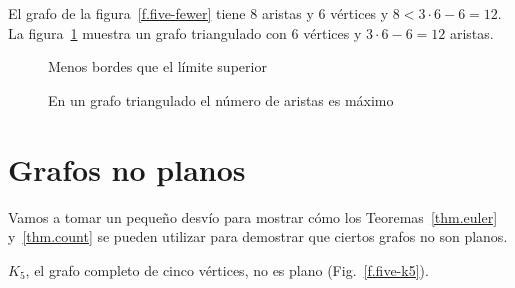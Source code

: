 \begin{example}
El grafo de la figura~\ref{f.five-fewer} tiene $8$ aristas y $6$ vértices y $8< 3\cdot 6 - 6= 12$.
La figura~\ref{f.five-upper-limit} muestra un grafo triangulado con $6$ vértices y $3\cdot 6 - 6= 12$ aristas.
\end{example}

\begin{figure}[t]
\begin{minipage}{.4\textwidth}
\begin{center}
\caption{Menos bordes que el límite superior}\label{f.five-fewer}
\end{center}
\end{minipage}
\hfill
\begin{minipage}{.55\textwidth}
\begin{center}
\caption{En un grafo triangulado el número de aristas es máximo}\label{f.five-upper-limit}
\end{center}
\end{minipage}
\end{figure}


\section{Grafos no planos}\label{s.nonplanar}

Vamos a tomar un pequeño desvío para mostrar cómo los Teoremas~\ref{thm.euler} y~\ref{thm.count} se pueden utilizar para demostrar que ciertos grafos no son planos.

\begin{theorem}
$K_5$, el grafo completo de cinco vértices, no es plano (Fig.~\ref{f.five-k5}).
\end{theorem}

